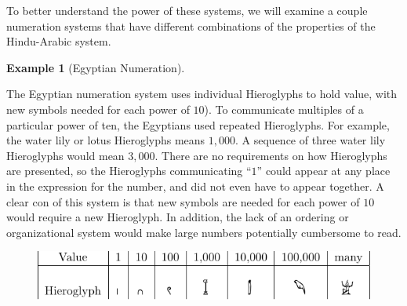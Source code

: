 \documentclass[
]{book}
\theoremstyle{definition}
\theoremstyle{definition}
\newtheorem{example}{Example}[chapter]
\theoremstyle{definition}
\theoremstyle{definition}
\theoremstyle{remark}
\begin{document}
To better understand the power of these systems, we will examine a couple numeration systems that have different combinations of the properties of the Hindu-Arabic system.

\begin{example}[Egyptian Numeration]
\protect\hypertarget{exm:unlabeled-div-38}{}\label{exm:unlabeled-div-38}

The Egyptian numeration system uses individual Hieroglyphs to hold value, with new symbols needed for each power of \(10\)). To communicate multiples of a particular power of ten, the Egyptians used repeated Hieroglyphs. For example, the water lily or lotus Hieroglyphs means \(1,000\). A sequence of three water lily Hieroglyphs would mean \(3,000\). There are no requirements on how Hieroglyphs are presented, so the Hieroglyphs communicating ``\(1\)'' could appear at any place in the expression for the number, and did not even have to appear together. A clear con of this system is that new symbols are needed for each power of \(10\) would require a new Hieroglyph. In addition, the lack of an ordering or organizational system would make large numbers potentially cumbersome to read.

\begin{figure}

{\centering \includegraphics[width=0.9\linewidth]{tikz/hieroglyphs} 

}

\end{figure}

\end{example}
\end{document}
